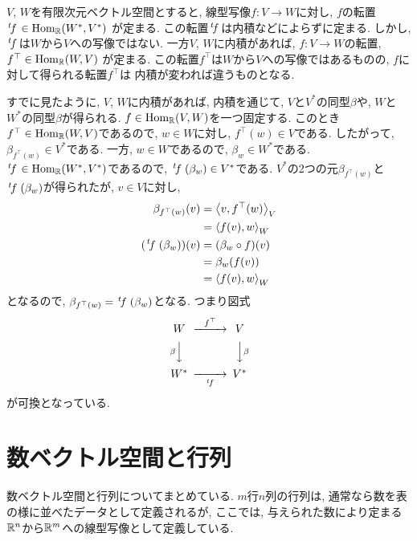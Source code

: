 \begin{remark}
  $V$, $W$を有限次元ベクトル空間とすると,
  線型写像$f\colon V\to W$に対し,
  $f$の転置
  $\left.^{t}\!f\right.\in\operatorname{Hom}_{\mathbb{R}}(W^\ast,V^\ast)$
  が定まる.
  この転置$\left.^{t}\!f\right.$は内積などによらずに定まる.
  しかし, $\left.^{t}\!f\right.$は$W$から$V$への写像ではない.
  一方$V$, $W$に内積があれば,
  $f\colon V\to W$の転置,
  $f^\top\in\operatorname{Hom}_{\mathbb{R}}(W,V)$
  が定まる.
  この転置$f^\top$は$W$から$V$への写像ではあるものの,
  $f$に対して得られる転置$f^\top$は
  内積が変われば違うものとなる.

  すでに見たように,
  $V$, $W$に内積があれば,
  内積を通じて,
  $V$と$V^\ast$の同型$\beta$や,
  $W$と$W^\ast$の同型$\beta$が得られる.
  $f\in \operatorname{Hom}_{\mathbb{R}}(V,W)$を一つ固定する.
  このとき$f^\top \in \operatorname{Hom}_{\mathbb{R}}(W,V)$であるので,
  $w\in W$に対し, $f^\top(w)\in V$である.
  したがって, $\beta_{f^\top(w)}\in V^\ast$である.
  一方, $w\in W$であるので, $\beta_w\in W^\ast$である.
  $\left.^{t}\!f\right.\in \operatorname{Hom}_{\mathbb{R}}(W^\ast,V^\ast)$であるので,
  $\left.^{t}\!f\right.(\beta_w)\in V^\ast$である.
  $V^\ast$の2つの元$\beta_{f^\top(w)}$と$\left.^{t}\!f\right.(\beta_w)$が得られたが,
  $v\in V$に対し,
  \begin{align*}
    \beta_{f^\top(w)}(v)
    &=\Braket{v,f^\top(w)}_V\\
    &=\Braket{f(v),w}_W\\
    (\left.^{t}\!f\right.(\beta_w))(v)
    &=(\beta_w\circ f)(v)\\
    &=\beta_w(f(v))\\
    &=\Braket{f(v),w}_W
  \end{align*}
  となるので,
  $\beta_{f^\top(w)}=\left.^{t}\!f\right.(\beta_w)$となる.
  つまり図式
  \begin{align*}
    \begin{CD}
      W @>f^\top>> V\\
      @V\beta VV @VV\beta V\\
      W^\ast @>>\transposed{f}> V^\ast
    \end{CD}
  \end{align*}
  が可換となっている.
\end{remark}


\section{数ベクトル空間と行列}
数ベクトル空間と行列についてまとめている.
$m$行$n$列の行列は,
通常なら数を表の様に並べたデータとして定義されるが,
ここでは, 与えられた数により定まる
$\mathbb{R}^n$から$\mathbb{R}^m$への線型写像として定義している.



